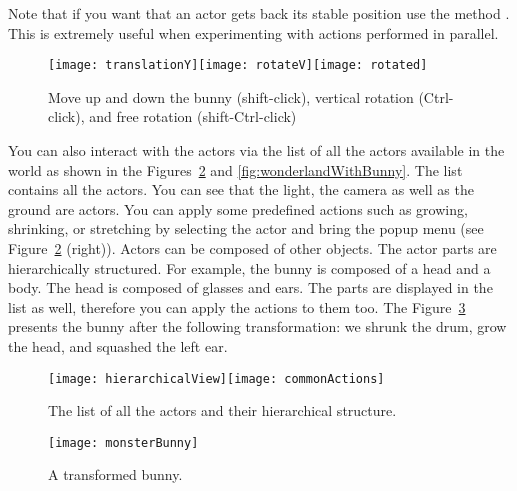 Note that if you want that an actor gets back its stable position use the method . This is extremely useful when experimenting with actions performed in parallel.


\begin{figure}
\begin{center}\texttt{[image: translationY]}\hspace{0.2cm}\texttt{[image: rotateV]}\hspace{0.2cm}\texttt{[image: rotated]}\end{center} \caption{Move up and down the bunny (shift-click), vertical rotation (Ctrl-click), and  free rotation (shift-Ctrl-click)\label{fig:translateRotate}}
\end{figure}

You can also interact with the actors via the list of all the actors available in the world as shown in the Figures~\ref{fig:hierarchical} and \ref{fig:wonderlandWithBunny}. The list contains all the actors. You can see that the light, the camera as well as the ground are actors. You can apply some predefined actions such as growing, shrinking, or stretching by selecting the actor and bring the popup menu (see Figure~\ref{fig:hierarchical} (right)). Actors can be composed of other objects. The actor parts are hierarchically structured. For example, the bunny is composed of a head and a body. The head is composed of glasses and ears. The parts are displayed in the list as well, therefore you can apply the actions to them too. The Figure~\ref{fig:monster} presents the bunny after the following transformation: we shrunk the drum, grow the head, and squashed the left ear. 

\begin{figure}
\begin{center}\texttt{[image: hierarchicalView]}\hspace{0.2cm}\texttt{[image: commonActions]}\end{center}
\caption{The list of all the actors and their hierarchical structure. \label{fig:hierarchical}}\end{figure}

\begin{figure}
\begin{center}\texttt{[image: monsterBunny]}\end{center}
\caption{A transformed bunny. \label{fig:monster}}
\end{figure}

